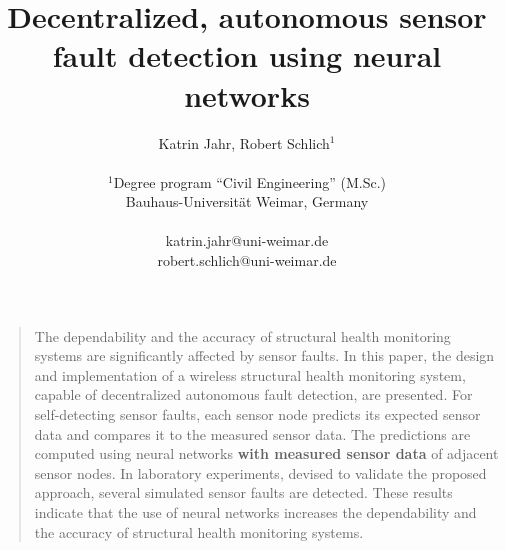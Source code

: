 \documentclass[12pt]{scrartcl}
\title{\textbf{ \Large{Decentralized, autonomous sensor fault detection using neural networks}} }
\author
{Katrin Jahr, Robert Schlich$^{1}$\\
\\
\normalsize{$^{1}$Degree program “Civil Engineering” (M.Sc.)}\\
\normalsize{Bauhaus-Universität Weimar, Germany}\\
\\
\normalsize{katrin.jahr@uni-weimar.de}\\
\normalsize{robert.schlich@uni-weimar.de}
}
\date{}
\newenvironment{sciabstract}{%
\begin{quote} \bf}
{\end{quote}}
\begin{document}
 


\baselineskip24pt


\maketitle 




\begin{sciabstract}

The dependability and the accuracy of structural health monitoring systems are significantly affected by sensor faults. 
In this paper, the design and implementation of a wireless structural health monitoring system, capable of decentralized autonomous fault detection, are presented. 
For self-detecting sensor faults, each sensor node predicts its expected sensor data and compares it to the measured sensor data. 
The predictions are computed using neural networks \textbf{with measured sensor data} of adjacent sensor nodes.
In laboratory experiments, devised to validate the proposed approach, several simulated sensor faults are detected.
These results indicate that the use of neural networks increases the dependability and the accuracy of structural health monitoring systems.




\end{sciabstract}
\end{document}
